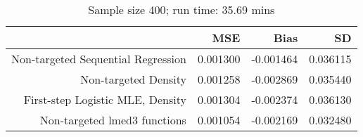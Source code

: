 \begin{table}[ht]
\centering
\caption{Sample size 400; run time: 35.69 mins} 
\begin{tabular}{rrrr}
  \hline
 & MSE & Bias & SD \\ 
  \hline
Non-targeted Sequential Regression & 0.001300 & -0.001464 & 0.036115 \\ 
  Non-targeted Density & 0.001258 & -0.002869 & 0.035440 \\ 
  First-step Logistic MLE, Density & 0.001304 & -0.002374 & 0.036130 \\ 
  Non-targeted lmed3 functions & 0.001054 & -0.002169 & 0.032480 \\ 
   \hline
\end{tabular}
\end{table}
